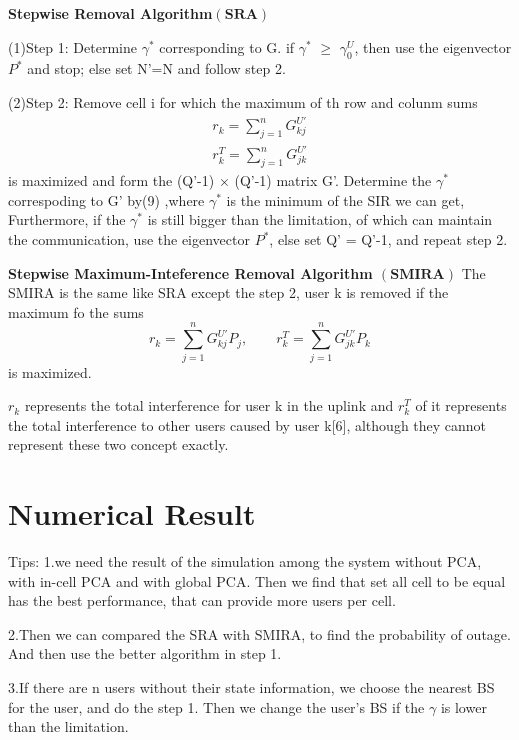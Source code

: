 \documentclass[conference]{IEEEtran}
\begin{document}
\vspace*{3mm}
\textbf{Stepwise Removal Algorithm$\left( \textbf{SRA} \right)$}              

(1)Step 1: Determine $\gamma^*$ corresponding to G. if $\gamma^*$ $\geq$ $\gamma^U_0$, then use the eigenvector $P^*$ and stop; else set N'=N and follow step 2.

(2)Step 2: Remove cell i for which the maximum of th row and colunm sums
\begin{align*}
r_k = \sum_{j=1}^{n} G^{U'}_{kj}\\
r_k^{T} = \sum_{j=1}^{n} G^{U'}_{jk}
\end{align*}
is maximized and form the (Q'-1) $\times$ (Q'-1) matrix G'. Determine the $\gamma^*$ correspoding to G' by(9) ,where $\gamma^*$ is the minimum of the SIR we can get, Furthermore, if the $\gamma^*$ is still bigger than the limitation, of which can maintain the communication, use the eigenvector $P^*$, else set Q' = Q'-1, and repeat step 2.

\textbf{Stepwise Maximum-Inteference Removal Algorithm $\left( \textbf{SMIRA} \right)$}              
The SMIRA is the same like SRA except the step 2, user k is removed if the maximum fo the sums 
\begin{equation}
r_k = \sum_{j=1}^{n}G^{U'}_{kj}P_j,\qquad r_k^{T} = \sum_{j=1}^{n}G^{U'}_{jk}P_k
\end{equation}
is maximized.

$r_k$ represents the total interference for user k in the uplink and $r_k^T$ of it represents the total interference to other users caused by user k[6], although they cannot represent these two concept exactly.  

\section{Numerical Result}

Tips:
1.we need the result of the simulation among the system without PCA, with in-cell PCA and with global PCA. Then we find that set all cell to be equal has the best performance, that can provide more users per cell.

2.Then we can compared the SRA with SMIRA, to find the probability of outage. And then use the better algorithm in step 1.

3.If there are n users without their state information, we choose the nearest BS for the user, and do the step 1. Then we change the user's BS if the $\gamma$ is lower than the limitation. 
\end{document}
